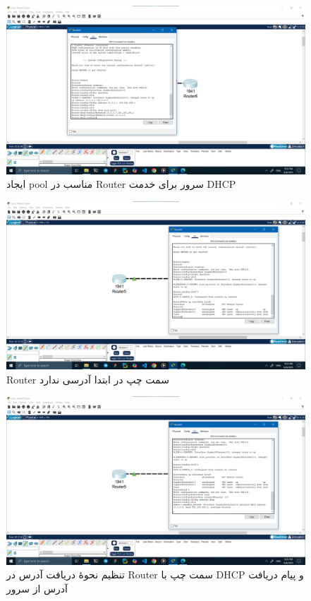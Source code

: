 \documentclass[12pt]{article}
\begin{document}
	\begin{figure}[H]
		\centering
		\includegraphics[width=\textwidth]{resources/scenario3-3.png}
		\caption{ایجاد \textenglish{pool} مناسب در \textenglish{Router} سرور برای خدمت \textenglish{DHCP}}
		\label{3:3}
	\end{figure}
	\begin{figure}[H]
		\centering
		\includegraphics[width=\textwidth]{resources/scenario3-4.png}
		\caption{\textenglish{Router} سمت چپ در ابتدا آدرسی ندارد}
		\label{3:4}
	\end{figure}
	\begin{figure}[H]
		\centering
		\includegraphics[width=\textwidth]{resources/scenario3-5.png}
		\caption{تنظیم نحوهٔ دریافت آدرس در \textenglish{Router} سمت چپ با \textenglish{DHCP} و پیام دریافت آدرس از سرور}
		\label{3:5}
	\end{figure}
\end{document}
